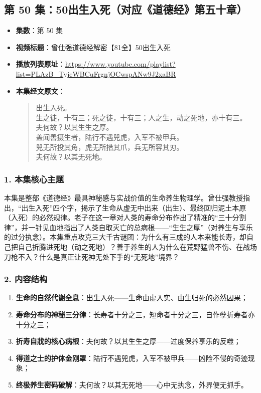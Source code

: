 \clearpage

\subsection{第 50 集：50出生入死（对应《道德经》第五十章）}
\label{sec:ep50}

\begin{itemize}
    \item \textbf{集数}：第 50 集
    \item \textbf{视频标题}：曾仕强道德经解密【81全】50出生入死
    \item \textbf{播放列表原址}：\url{https://www.youtube.com/playlist?list=PLAzB_TyjeWBCuFrgnjOCwspANw9J2xaBR}
    \item \textbf{本集经文原文}：
    \begin{quote}\kaishu
    出生入死。\\
    生之徒，十有三；死之徒，十有三；人之生，动之死地，亦十有三。\\
    夫何故？以其生生之厚。\\
    盖闻善摄生者，陆行不遇兕虎，入军不被甲兵。\\
    兕无所投其角，虎无所措其爪，兵无所容其刃。\\
    夫何故？以其无死地。
    \end{quote}
\end{itemize}

\subsubsection{1. 本集核心主题}
本集是整部《道德经》最具神秘感与实战价值的生命养生物理学。曾仕强教授指出，“出生入死”四个字，揭示了生命从虚无中出来（出生）、最终回归泥土本原（入死）的必然规律。老子在这一章对人类的寿命分布作出了精准的“三十分割律”，并一针见血地指出了人类自取灭亡的总病根——“生生之厚”（对养生与享乐的过分执念）。本集重点攻克三大千古谜团：为什么有三成的人本来能长寿，却自己把自己折腾进死地（动之死地）？善于养生的人为什么在荒野猛兽不伤、在战场刀枪不入？什么是真正让死神无处下手的“无死地”境界？

\subsubsection{2. 内容结构}
\begin{enumerate}
    \item \textbf{生命的自然代谢全息}：出生入死——生命由虚入实、由生归死的必然因果；
    \item \textbf{寿命分布的神秘三分律}：长寿者十分之三，短命者十分之三，自作孽折寿者亦十分之三；
    \item \textbf{折寿自戕的核心病根}：夫何故？以其生生之厚——过度保养享乐的反噬；
    \item \textbf{得道之士的护体金刚罩}：陆行不遇兕虎，入军不被甲兵——凶险不侵的奇迹现象；
    \item \textbf{终极养生密码破解}：夫何故？以其无死地——心中无执念，外界便无抓手。
\end{enumerate}


